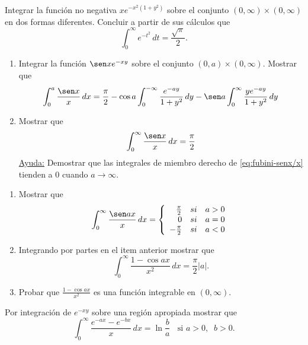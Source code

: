 \documentclass{book}
\begin{document}
\begin{ejer}{} 
Integrar la función no negativa $xe^{-x^2(1+y^2)}$ sobre el conjunto $(0,\infty)\times (0,\infty)$
en dos formas diferentes. Concluir a partir de sus cálculos que 
\[
\int_0^{\infty} e^{-t^2}\,dt=\frac{\sqrt{\pi}}{2}.
\]
\end{ejer}


\begin{ejer}{} 
\begin{enumerate}
\item Integrar la función $\sen x e^{-xy}$ sobre el conjunto $(0,a)\times (0,\infty)$.
Mostrar que 
\begin{equation}\label{eq:fubini-senx/x}
\int_0^a \frac{\sen x}{x}\,dx=
\frac{\pi}{2}-\cos a\int_0^{-\infty} \frac{e^{-ay}}{1+y^2}\,dy
-\sen a \int_0^{\infty} \frac{y e^{-ay}}{1+y^2}\,dy
\end{equation}
\item Mostrar que 
\[
\int_0^{\infty }\frac{\sen x}{x}\,dx=\frac{\pi}{2}
\]
\underline{Ayuda:} 
Demostrar que las integrales de miembro derecho de \eqref{eq:fubini-senx/x} tienden a 0 cuando $a \to \infty$.
\end{enumerate} 
\end{ejer}


\begin{ejer}{}
\begin{enumerate}
\item Mostrar que
\[
\int_0^{\infty} \frac{\sen a x}{x}\,dx= 
\left
\{\begin{array}{rll}
\frac{\pi}{2}&si&a>0
\\
0&si&a=0
\\
-\frac{\pi}{2}&si&a<0
\end{array}
\right.
\] 
\item Integrando por partes en el item anterior mostrar que
\[
\int_0^{\infty}\frac{1-\cos ax}{x^2}\,dx=\frac{\pi}{2}|a|.
\]
\item Probar que $\frac{1-\cos ax}{x^2}$ es una función integrable en $(0,\infty)$.
\end{enumerate}
\end{ejer}


\begin{ejer}{}
 Por integración de $e^{-xy}$ sobre una región apropiada mostrar que 
\[
\int_0^{\infty}\frac{e^{-ax}-e^{-bx}}{x}\,dx=\ln\frac{b}{a}\;\; \mbox{  si   }a>0, \;\;b>0.
\]
\end{ejer}
\end{document}
